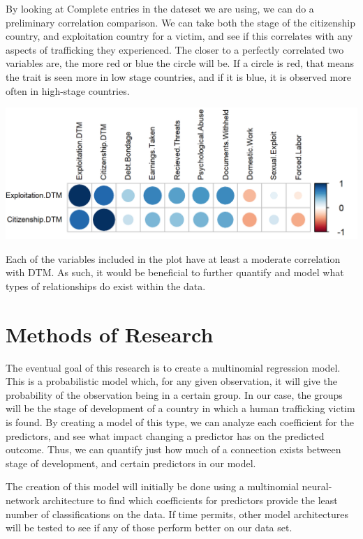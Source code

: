 \documentclass{article} %
\begin{document}
By looking at Complete entries in the dateset we are using, we can do a preliminary correlation comparison. We can take both the stage of the citizenship country, and exploitation country for a victim, and see if this correlates with any aspects of trafficking they experienced. The closer to a perfectly correlated two variables are, the more red or blue the circle will be. If a circle is red, that means the trait is seen more in low stage countries, and if it is blue, it is observed more often in high-stage countries.

\hspace*{-1.5cm}
\includegraphics{Corrplot} \bigskip

Each of the variables included in the plot have at least a moderate correlation with DTM. As such, it would be beneficial to further quantify and model what types of relationships do exist within the data.

\section{Methods of Research}

The eventual goal of this research is to create a multinomial regression model. This is a probabilistic model which, for any given observation, it will give the probability of the observation being in a certain group. In our case, the groups will be the stage of development of a country in which a human trafficking victim is found. By creating a model of this type, we can analyze each coefficient for the predictors, and see what impact changing a predictor has on the predicted outcome. Thus, we can quantify just how much of a connection exists between stage of development, and certain predictors in our model.

The creation of this model will initially be done using a multinomial neural-network architecture to find which coefficients for predictors provide the least number of classifications on the data. If time permits, other model architectures will be tested to see if any of those perform better on our data set.
\end{document}
